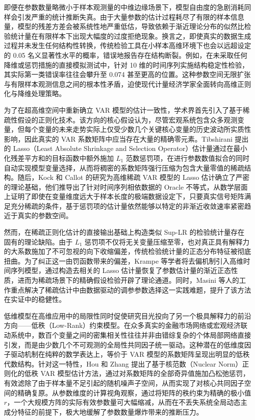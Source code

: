 \documentclass[UTF8,a4paper,12pt]{ctexbook}
\begin{document}
即便在参数数量略微小于样本观测量的中维边缘场景下，模型自由度的急剧消耗同样会引发严重的统计推断失真。由于大量参数的估计过程耗尽了有限的样本信息量，模型的残差方差会被系统性地严重低估，导致依赖于渐近理论分布的似然比检验统计量在有限样本下出现大幅度的过度拒绝现象。换言之，即使真实的数据生成过程并未发生任何结构性转换，传统检验工具在小样本高维环境下也会以远超设定的 0.05 名义显著性水平的概率，错误地报告存在结构断裂。例如，在未采取任何降维或惩罚措施的直接模拟测试中，针对 10 维的时间序列实施结构稳定性检验，其实际第一类错误率往往会攀升至 0.074 甚至更高的位置。这种参数空间无限扩张与有限样本观测信息之间的根本性矛盾，迫使现代计量经济学家全面转向高维正则化与降维处理策略。

为了在超高维空间中重新确立 VAR 模型的估计一致性，学术界首先引入了基于稀疏性假设的正则化技术。该方向的核心假设认为，尽管宏观系统包含众多观测变量，但每个变量的未来走势实际上仅受少数几个关键核心变量的历史波动所实质性影响，因此真实的 VAR 系数矩阵中应当存在大量的精确零元素。Tibshirani 提出的 Lasso（Least Absolute Shrinkage and Selection Operator）估计量通过在最小化残差平方和的目标函数中额外施加 $L_1$ 范数惩罚项，在进行参数数值拟合的同时自动实现模型变量选择，从而将稠密的系数矩阵强行压缩为包含大量零值的稀疏结构。随后，Kock 和 Callot 的研究为高维稀疏 VAR 模型的 Lasso 估计确立了严密的理论基础，他们推导出了针对时间序列相依数据的 Oracle 不等式，从数学层面上证明了即使在变量维度远大于样本长度的极端数据设定下，只要真实信号矩阵满足充分稀疏的条件，基于惩罚项的估计量依然能够以特定的非渐近收敛速率紧密趋近于真实的参数空间。

然而，在稀疏正则化估计的直接输出基础上构造类似 Sup-LR 的检验统计量存在固有的理论缺陷。由于 $L_1$ 惩罚项不仅将无关变量压缩至零，也对真正具有解释力的大系数施加了不可忽视的向下收缩偏差，传统检验统计量的正态分布特征被彻底扭曲。为了纠正这一由罚函数带来的偏差，Krampe 等学者将去偏机制引入高维时间序列模型，通过构造去相关的 Lasso 估计量恢复了参数估计量的渐近正态性质，进而为稀疏场景下的精确假设检验开辟了理论通道。同时，Masini 等人的工作重点解决了稀疏估计中由数据驱动的调参参数选择这一实践难题，提升了该方法在实证中的稳健性。

低维模型在高维应用中的局限性同时促使研究目光投向了另一个极具解释力的前沿方向——低秩（Low-Rank）约束模型。在众多真实的金融市场网络或宏观经济联动系统中，数百个变量之间的密集相关性往往并非由错综复杂的个体局部网络直接引发，而是由少数几个不可观测的全局性共同因子统一驱动。这种潜在的低维度因子驱动机制在纯粹的数学表达上，等价于 VAR 模型的系数矩阵呈现出明显的低秩代数结构。针对这一特性，Hou 和 Zhang 提出了基于核范数（Nuclear Norm）正则化的低秩 VAR 模型估计方法，通过对系数矩阵的全部奇异值施加凸松弛惩罚，有效滤除了由于样本量不足引起的随机噪声子空间，从而实现了对核心共同因子空间的精确复原。从参数维度的计算视角观察，通过将矩阵的秩约束为精确的极小值 $r$，一个大规模方阵的实际有效参数量可大幅缩减，从而在不丢失系统全局动态主成分特征的前提下，极大地缓解了参数数量爆炸带来的推断压力。
\end{document}
